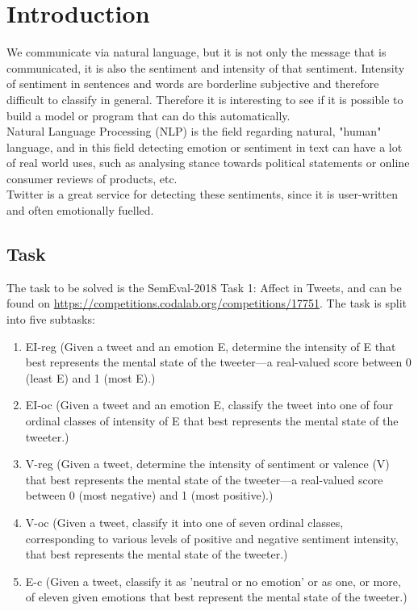 \section{Introduction}
We communicate via natural language, but it is not only the message that is communicated, it is also the sentiment and intensity of that sentiment. Intensity of sentiment in sentences and words are borderline subjective and therefore difficult to classify in general. Therefore it is interesting to see if it is possible to build a model or program that can do this automatically. \\
Natural Language Processing (NLP) is the field regarding natural, "human" language, and in this field detecting emotion or sentiment in text can have a lot of real world uses, such as analysing stance towards political statements or online consumer reviews of products, etc. \\
Twitter is a great service for detecting these sentiments, since it is user-written and often emotionally fuelled.
\subsection{Task} \label{sec:task}
The task to be solved is the SemEval-2018 Task 1: Affect in Tweets, and can be found on \href{https://competitions.codalab.org/competitions/17751}{https://competitions.codalab.org/competitions/17751}. The task is split into five subtasks:\\
\begin{enumerate}
\item EI-reg (Given a tweet and an emotion E, determine the  intensity of E that best represents the mental state of the tweeter—a real-valued score between 0 (least E) and 1 (most E).)
\item EI-oc (Given a tweet and an emotion E, classify the tweet into one of four ordinal classes of intensity of E that best represents the mental state of the tweeter.)
\item V-reg (Given a tweet, determine the intensity of sentiment or valence (V) that best represents the mental state of the tweeter—a real-valued score between 0 (most negative) and 1 (most positive).)
\item V-oc (Given a tweet, classify it into one of seven ordinal classes, corresponding to various levels of positive and negative sentiment intensity, that best represents the mental state of the tweeter.)
\item E-c (Given a tweet, classify it as 'neutral or no emotion' or as one, or more, of eleven given emotions that best represent the mental state of the tweeter.)
\end{enumerate}
 
